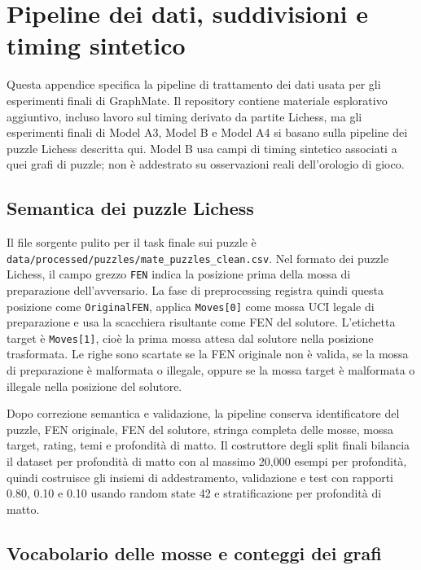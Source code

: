 \chapter{Pipeline dei dati, suddivisioni e timing sintetico}
\label{app:data-pipeline}

Questa appendice specifica la pipeline di trattamento dei dati usata per gli esperimenti finali di GraphMate.  Il repository contiene materiale esplorativo aggiuntivo, incluso lavoro sul timing derivato da partite Lichess, ma gli esperimenti finali di Model A3, Model B e Model A4 si basano sulla pipeline dei puzzle Lichess descritta qui.  Model B usa campi di timing sintetico associati a quei grafi di puzzle; non è addestrato su osservazioni reali dell'orologio di gioco.



\section{Semantica dei puzzle Lichess}
\label{app:data-pipeline:lichess}

Il file sorgente pulito per il task finale sui puzzle è \\
\texttt{data/processed/puzzles/mate\_puzzles\_clean.csv}.  Nel formato dei puzzle Lichess, il campo grezzo \texttt{FEN} indica la posizione prima della mossa di preparazione dell'avversario.  La fase di preprocessing registra quindi questa posizione come \texttt{OriginalFEN}, applica \texttt{Moves[0]} come mossa UCI legale di preparazione e usa la scacchiera risultante come FEN del solutore.  L'etichetta target è \texttt{Moves[1]}, cioè la prima mossa attesa dal solutore nella posizione trasformata.  Le righe sono scartate se la FEN originale non è valida, se la mossa di preparazione è malformata o illegale, oppure se la mossa target è malformata o illegale nella posizione del solutore.

Dopo correzione semantica e validazione, la pipeline conserva identificatore del puzzle, FEN originale, FEN del solutore, stringa completa delle mosse, mossa target, rating, temi e profondità di matto.  Il costruttore degli split finali bilancia il dataset per profondità di matto con al massimo 20,000 esempi per profondità, quindi costruisce gli insiemi di addestramento, validazione e test con rapporti 0.80, 0.10 e 0.10 usando random state 42 e stratificazione per profondità di matto.

\section{Vocabolario delle mosse e conteggi dei grafi}
\label{app:data-pipeline:vocab}

